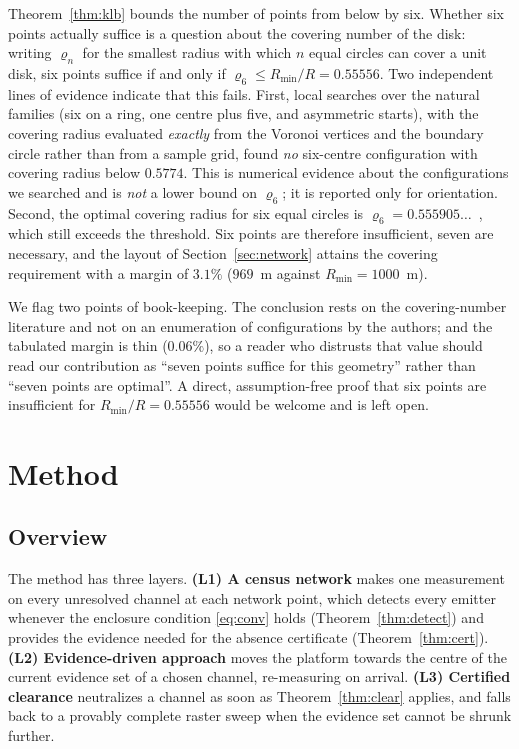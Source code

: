 \documentclass[journal,10pt]{IEEEtran}
\theoremstyle{definition}
\newcommand{\Rmin}{R_{\min}}
\begin{document}
Theorem~\ref{thm:klb} bounds the number of points from below by six. Whether six points actually
suffice is a question about the covering number of the disk: writing $\varrho_n$ for the smallest
radius with which $n$ equal circles can cover a unit disk, six points suffice if and only if
$\varrho_6\le\Rmin/R=0.55556$. Two independent lines of evidence indicate that this fails.
First, local searches over the natural families (six on a ring, one centre plus five, and
asymmetric starts), with the covering radius evaluated \emph{exactly} from the Voronoi vertices
and the boundary circle rather than from a sample grid, found \emph{no} six-centre configuration
with covering radius below $0.5774$. This is numerical evidence about the configurations we
searched and is \emph{not} a lower bound on $\varrho_6$; it is reported only for orientation.
Second, the optimal covering radius for six equal circles is
$\varrho_6=0.555905\ldots$~\cite{bezdek1983,nica2011},
which still exceeds the threshold. Six points are therefore insufficient, seven are necessary,
and the layout of
Section~\ref{sec:network} attains the covering requirement with a margin of $3.1\%$
($969$~m against $\Rmin=1000$~m).

We flag two points of book-keeping. The conclusion rests on the covering-number literature and
not on an enumeration of configurations by the authors; and the tabulated margin is thin
($0.06\%$), so a reader who distrusts that value should read our contribution as ``seven points
suffice for this geometry'' rather than ``seven points are optimal''. A direct, assumption-free
proof that six points are insufficient for $\Rmin/R=0.55556$ would be welcome and is left open.


\section{Method}
\label{sec:method}

\subsection{Overview}
The method has three layers. \textbf{(L1) A census network} makes one measurement on every
unresolved channel at each network point, which detects every emitter whenever the enclosure
condition \eqref{eq:conv} holds (Theorem~\ref{thm:detect}) and provides the evidence needed for the
absence certificate
(Theorem~\ref{thm:cert}). \textbf{(L2) Evidence-driven approach} moves the platform towards the
centre of the current evidence set of a chosen channel, re-measuring on arrival. \textbf{(L3)
Certified clearance} neutralizes a channel as soon as Theorem~\ref{thm:clear} applies, and falls
back to a provably complete raster sweep when the evidence set cannot be shrunk further.
\end{document}

